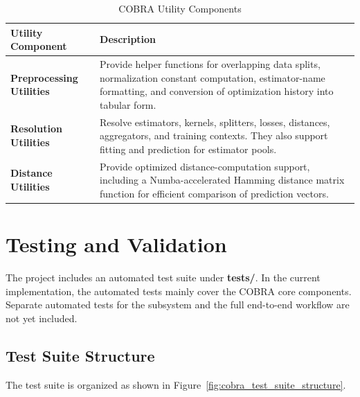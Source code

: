 \begin{table}[H]
      \centering
      \caption{COBRA Utility Components}
      \label{tab:cobra_utility_components}
      \begin{tabularx}{\textwidth}{
                  >{\raggedright\arraybackslash}p{3.5cm}
                  >{\raggedright\arraybackslash}X
            }
            \toprule
            \textbf{Utility Component}       & \textbf{Description}                                                                                                                        \\
            \midrule
            \textbf{Preprocessing Utilities} &
            Provide helper functions for overlapping data splits, normalization constant computation, estimator-name formatting, and conversion of optimization history into tabular form. \\

            \textbf{Resolution Utilities}    &
            Resolve estimators, kernels, splitters, losses, distances, aggregators, and training contexts. They also support fitting and prediction for estimator pools.                   \\

            \textbf{Distance Utilities}      &
            Provide optimized distance-computation support, including a Numba-accelerated Hamming distance matrix function for efficient comparison of prediction vectors.                 \\
            \bottomrule
      \end{tabularx}
\end{table}


\section{Testing and Validation}
\label{sec:testing_validation}

\hs The project includes an automated test suite under \textbf{tests/}. In the current implementation, the automated tests mainly cover the COBRA core components. Separate automated tests for the \KFCProcedure{} subsystem and the full end-to-end \KFCProcedure{} workflow are not yet included.

\subsection{Test Suite Structure}

\hs The test suite is organized as shown in Figure~\ref{fig:cobra_test_suite_structure}.

